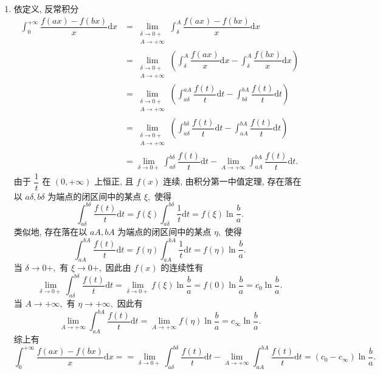 \begin{solution}
\begin{enumerate}
\item 依定义, 反常积分
\begin{align*}
\int_0^{+\infty} \dfrac{f(ax) - f(bx)}{x} \mathrm{d}x & = \lim_{\substack{\delta \to 0+ \\ A \to +\infty}} \int_{\delta}^A \dfrac{f(ax) - f(bx)}{x} \mathrm{d}x \\
& = \lim_{\substack{\delta \to 0+ \\ A \to +\infty}} \left( \int_{\delta}^A \dfrac{f(ax)}{x} \mathrm{d}x - \int_{\delta}^A \dfrac{f(bx)}{x} \mathrm{d}x \right) \\
& = \lim_{\substack{\delta \to 0+ \\ A \to +\infty}} \left( \int_{a\delta}^{aA} \dfrac{f(t)}{t} \mathrm{d}t - \int_{b\delta}^{bA} \dfrac{f(t)}{t} \mathrm{d}t \right) \\
& = \lim_{\substack{\delta \to 0+ \\ A \to +\infty}} \left( \int_{a\delta}^{b\delta} \dfrac{f(t)}{t} \mathrm{d}t - \int_{aA}^{bA} \dfrac{f(t)}{t} \mathrm{d}t \right) \\
& = \lim_{\delta \to 0+} \int_{a\delta}^{b\delta} \dfrac{f(t)}{t} \mathrm{d}t - \lim_{A \to +\infty} \int_{aA}^{bA} \dfrac{f(t)}{t} \mathrm{d}t.
\end{align*}
由于 $\dfrac{1}{t}$ 在 $(0, +\infty)$ 上恒正, 且 $f(x)$ 连续, 由积分第一中值定理, 存在落在以 $a\delta, b\delta$ 为端点的闭区间中的某点 $\xi,$ 使得
\begin{equation*}
\int_{a\delta}^{b\delta} \dfrac{f(t)}{t} \mathrm{d}t = f(\xi) \int_{a\delta}^{b\delta} \dfrac{1}{t} \mathrm{d}t = f(\xi) \ln \dfrac{b}{a}.
\end{equation*}
类似地, 存在落在以 $aA, bA$ 为端点的闭区间中的某点 $\eta,$ 使得
\begin{equation*}
\int_{aA}^{bA} \dfrac{f(t)}{t} \mathrm{d}t = f(\eta) \int_{aA}^{bA} \dfrac{1}{t} \mathrm{d}t = f(\eta) \ln \dfrac{b}{a}.
\end{equation*}
当 $\delta \to 0+,$ 有 $\xi \to 0+,$ 因此由 $f(x)$ 的连续性有
\begin{equation*}
\lim_{\delta \to 0+} \int_{a\delta}^{b\delta} \dfrac{f(t)}{t} \mathrm{d}t = \lim_{\delta \to 0+} f(\xi) \ln \dfrac{b}{a} = f(0) \ln \dfrac{b}{a} = c_0 \ln \dfrac{b}{a}.
\end{equation*}
当 $A \to +\infty,$ 有 $\eta \to +\infty,$ 因此有
\begin{equation*}
\lim_{A \to +\infty} \int_{aA}^{bA} \dfrac{f(t)}{t} \mathrm{d}t = \lim_{A \to +\infty} f(\eta) \ln \dfrac{b}{a} = c_{\infty} \ln \dfrac{b}{a}.
\end{equation*}
综上有
\begin{equation*}
\int_0^{+\infty} \dfrac{f(ax) - f(bx)}{x} \mathrm{d}x = = \lim_{\delta \to 0+} \int_{a\delta}^{b\delta} \dfrac{f(t)}{t} \mathrm{d}t - \lim_{A \to +\infty} \int_{aA}^{bA} \dfrac{f(t)}{t} \mathrm{d}t = (c_0 - c_{\infty}) \ln \dfrac{b}{a}.
\end{equation*}


\end{enumerate}
\end{solution}
